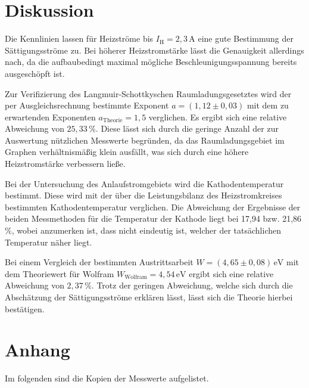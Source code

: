 \section{Diskussion}
\label{sec:Diskussion}

Die Kennlinien lassen für Heizströme bis $I_\text{H} = 2,3\,\si{\ampere}$ eine gute Bestimmung der
Sättigungsströme zu. Bei höherer Heizstromstärke lässt die Genauigkeit allerdings nach, da die aufbaubedingt
maximal mögliche Beschleunigungsspannung bereits ausgeschöpft ist.

\noindent Zur Verifizierung des Langmuir-Schottkyschen Raumladungsgesetztes wird der per Ausgleichsrechnung bestimmte
Exponent $a = (1,12 \pm 0,03)$ mit dem zu erwartenden Exponenten $a_\text{Theorie} = 1,5$ verglichen. Es ergibt sich eine relative
Abweichung von $25,33\,\%$. Diese lässt sich durch die geringe Anzahl der zur Auswertung nützlichen Messwerte begründen,
da das Raumladungsgebiet im Graphen verhältnismäßig klein ausfällt, was sich durch eine höhere Heizstromstärke verbessern ließe.

\noindent Bei der Untersuchung des Anlaufstromgebiets wird die Kathodentemperatur bestimmt. 
Diese wird mit der über die Leistungsbilanz des Heizstromkreises bestimmten Kathodentemperatur verglichen.
Die Abweichung der Ergebnisse der beiden Messmethoden für die Temperatur der Kathode liegt bei 17,94 bzw. 21,86\,\%,
wobei anzumerken ist, dass nicht eindeutig ist, welcher der tatsächlichen Temperatur näher liegt.

\noindent Bei einem Vergleich der bestimmten Austrittsarbeit $W = (4,65 \pm 0,08)\,\si{\eV}$ mit dem Theoriewert
für Wolfram $W_\text{Wolfram} = 4,54\,\si{\eV}$ \cite{kent2} ergibt sich eine relative Abweichung von $2,37\,\%$. Trotz der
geringen Abweichung, welche sich durch die Abschätzung der Sättigungsströme erklären lässt,
lässt sich die Theorie hierbei bestätigen. 

\section{Anhang}
\label{Anhang}
Im folgenden sind die Kopien der Messwerte aufgelistet.

